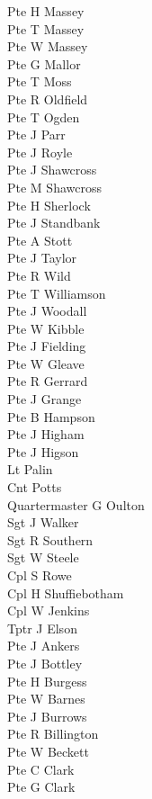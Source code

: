 \begin{multicols}{2}
  Pte H Massey \\
  Pte T Massey \\
  Pte W Massey \\
  Pte G Mallor \\
  Pte T Moss \\
  Pte R Oldfield \\
  Pte T Ogden \\
  Pte J Parr \\
  Pte J Royle \\
  Pte J Shawcross \\
  Pte M Shawcross \\
  Pte H Sherlock \\
  Pte J Standbank \\
  Pte A Stott \\
  Pte J Taylor \\
  Pte R Wild \\
  Pte T Williamson \\
  Pte J Woodall \\
  Pte W Kibble \\
  Pte J Fielding \\
  Pte W Gleave \\
  Pte R Gerrard \\
  Pte J Grange \\
  Pte B Hampson \\
  Pte J Higham \\
  Pte J Higson \\
  Lt Palin \\
  Cnt Potts \\
  Quartermaster G Oulton \\
  Sgt J Walker \\
  Sgt R Southern \\
  Sgt W Steele \\
  Cpl S Rowe \\
  Cpl H Shuffiebotham \\
  Cpl W Jenkins \\
  Tptr J Elson \\
  Pte J Ankers \\
  Pte J Bottley \\
  Pte H Burgess \\
  Pte W Barnes \\
  Pte J Burrows \\
  Pte R Billington \\
  Pte W Beckett \\
  Pte C Clark \\
  Pte G Clark \\

\end{multicols}
